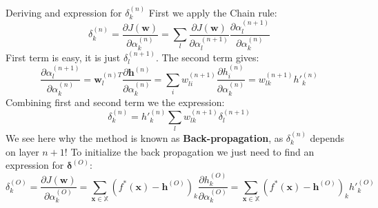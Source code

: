 \documentclass[]{beamer}
\begin{document}
\begin{frame}
   {Deriving and expression for $\delta^{(n)}_k$}
   \scriptsize
   First we apply the Chain rule:
   \begin{equation*}
      \delta_k^{(n)} = \frac{\partial J \left( \boldsymbol{w} \right) }{\partial \alpha^{(n)}_k} 
                     = \sum_l \frac{\partial J \left( \boldsymbol{w} \right) }{\partial \alpha_l^{(n+1)} } \frac{\partial \alpha_l^{(n + 1)} }{\partial \alpha^{(n)}_k}
   \end{equation*}
   First term is easy, it is just $\delta_l^{(n+1)}$. The second term gives:
   \begin{equation*}
      \frac{\partial \alpha_l^{(n + 1)} }{\partial \alpha^{(n)}_k} = \boldsymbol{w}^{(n)T}_l \frac{\partial \boldsymbol{h}^{(n)}}{\partial \alpha^{(n)}_k}
                                                                   = \sum_i w^{(n+1)}_{li} \frac{\partial h^{(n)}_i}{\partial \alpha^{(n)}_k}
                                                                   = w^{(n+1)}_{lk} h'^{(n)}_k
   \end{equation*}
   Combining first and second term we the expression:
   \begin{equation*}
      \delta^{(n)}_k = h'^{(n)}_k \sum_l w^{(n+1)}_{lk} \delta_l^{(n+1)}
   \end{equation*}
   We see here why the method is known as \textbf{Back-propagation}, as $\delta^{(n)}_k$ depends on layer $n + 1$! 
   To initialize the back propagation we just need to find an expression for $\boldsymbol{\delta}^{(O)}$:
   \begin{equation*}
      \delta^{(O)}_k = \frac{\partial J \left( \boldsymbol{w} \right) }{\partial \alpha^{(O)}_k} 
                     = \sum_{\boldsymbol{x} \in \mathbb{X}} \left( f^*\left( \boldsymbol{x} \right) - \boldsymbol{h}^{(O)} \right)_k \frac{\partial h^{(O)}_k }{\partial \alpha^{(O)}_k}
                     = \sum_{\boldsymbol{x} \in \mathbb{X}} \left( f^*\left( \boldsymbol{x} \right) - \boldsymbol{h}^{(O)} \right)_k h'^{(O)}_k
   \end{equation*}
\end{frame}
\end{document}

